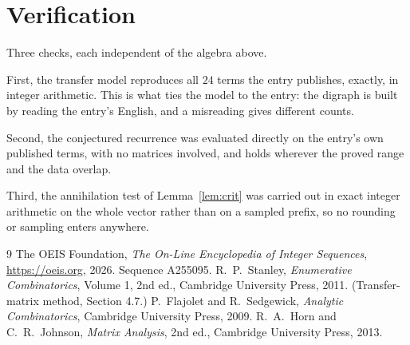 \documentclass[11pt,a4paper]{article}
\theoremstyle{plain}
\theoremstyle{definition}
\begin{document}
\section{Verification}

Three checks, each independent of the algebra above.

First, the transfer model reproduces all $24$ terms the entry publishes, exactly, in
integer arithmetic. This is what ties the model to the entry: the digraph is built by reading
the entry's English, and a misreading gives different counts.

Second, the conjectured recurrence was evaluated directly on the entry's own published terms,
with no matrices involved, and holds wherever the proved range and the data overlap.

Third, the annihilation test of Lemma~\ref{lem:crit} was carried out in exact integer
arithmetic on the whole vector rather than on a sampled prefix, so no rounding or sampling
enters anywhere.

\begin{thebibliography}{9}
 The OEIS Foundation, \emph{The On-Line Encyclopedia of Integer
Sequences}, \url{https://oeis.org}, 2026. Sequence A255095.
 R.~P.~Stanley, \emph{Enumerative Combinatorics}, Volume 1, 2nd ed.,
Cambridge University Press, 2011. (Transfer-matrix method, Section 4.7.)
 P.~Flajolet and R.~Sedgewick, \emph{Analytic Combinatorics}, Cambridge
University Press, 2009.
 R.~A.~Horn and C.~R.~Johnson, \emph{Matrix Analysis}, 2nd ed., Cambridge
University Press, 2013.
\end{thebibliography}
\end{document}
